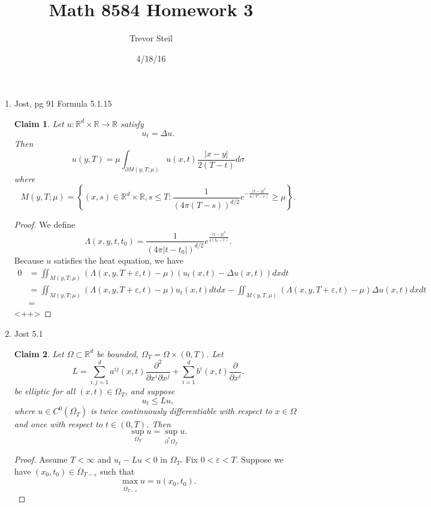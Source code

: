 \documentclass[a4paper]{article}
\title{Math 8584 Homework 3 }
\date{4/18/16}
\author{Trevor Steil}
\newtheorem*{claim}{Claim}
\newcommand{\R}{\mathbb{R}}
\begin{document}
\maketitle
\begin{enumerate}
  \item Jost, pg 91 Formula 5.1.15
    \begin{claim}
      Let $u: \R^d \times \R \to \R$ satisfy
      \begin{equation*}
        u_t = \Delta u.
      \end{equation*}
      Then
      \[ u(y,T) = \mu \int_{\partial M(y, T; \mu)}^{} u(x,t) \frac{|x-y|}{2(T-t)} d \sigma \]
      where
      \[ M(y,T; \mu) = \left\{ (x,s) \in \R^d \times \R, s \leq T : \frac{1}{(4 \pi (T-s))^{d/2}} e^{-\frac{|x-y|^2}{4(T-s)} } \geq \mu \right\} .\]
    \end{claim}

    \begin{proof}
      We define
      \[ \Lambda(x,y,t,t_0) = \frac{1}{(4 \pi |t-t_0|)^{d/2}} e^{\frac{|x-y|^2}{4(t_0 - t)} } .\]
      Because $u$ satisfies the heat equation, we have
      \begin{align*}
        0 &= \iint_{M(y,T;\mu)}^{} ( \Lambda(x,y,T+\varepsilon,t) - \mu) (u_t (x,t) - \Delta u(x,t)) dx dt \\
        &= \iint_{M(y,T;\mu)}^{} ( \Lambda(x,y,T+\varepsilon,t) - \mu ) u_t(x,t) dt dx
        - \iint_{M(y,T,\mu)}^{} ( \Lambda(x,y,T+\varepsilon,t) - \mu ) \Delta u(x,t) dx dt \\
        &=
      \end{align*}<++>
    \end{proof}

  \item Jost 5.1
    \begin{claim}
      Let $\Omega \subset \R^d$ be bounded, $\Omega_T = \Omega \times (0,T)$. Let
      \[ L = \sum_{i,j=1}^d a^{ij}(x,t) \frac{\partial^2}{\partial x^i \partial x^j} + \sum_{i=1}^d b^i(x,t) \frac{\partial}{\partial x^i} .\]
      be elliptic for all $(x,t) \in \Omega_T$, and suppose
      \[ u_t \leq Lu, \]
      where $u \in C^0(\overline{\Omega_T})$ is twice continuously differentiable with respect to $x \in \Omega$ and once with respect to $t \in
      (0,T)$. Then
      \[ \sup_{\Omega_T} u = \sup_{\partial^\ast \Omega_T} u. \]
    \end{claim}

    \begin{proof}
      Assume $T < \infty$ and $u_t - Lu < 0$ in $\Omega_T$.
      Fix $0<\varepsilon<T$. Suppose we have $(x_0,t_0) \in \overline{\Omega}_{T-\varepsilon}$ such that
      \[ \max_{\overline{\Omega}_{T-\varepsilon}} u = u(x_0,t_0) .\]


\end{proof}
\end{enumerate}
\end{document}
